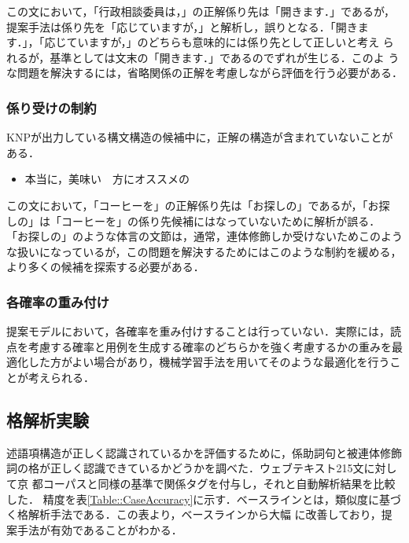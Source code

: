 \documentclass[japanese]{jnlp_1.3e}
\begin{document}
この文において，「行政相談委員は，」の正解係り先は「開きます．」であるが，
提案手法は係り先を「応じていますが，」と解析し，誤りとなる．「開きま
す．」，「応じていますが，」のどちらも意味的には係り先として正しいと考え
られるが，基準としては文末の「開きます．」であるのでずれが生じる．このよ
うな問題を解決するには，省略関係の正解を考慮しながら評価を行う必要がある．


\subsubsection*{係り受けの制約}

KNPが出力している構文構造の候補中に，正解の構造が含まれていないことがある．

\begin{itemize}
 \item 本当に，美味い~~方にオススメの
\end{itemize}

この文において，「コーヒーを」の正解係り先は「お探しの」であるが，「お探
しの」は「コーヒーを」の係り先候補にはなっていないために解析が誤る．
「お探しの」のような体言の文節は，通常，連体修飾しか受けないためこのよう
な扱いになっているが，この問題を解決するためにはこのような制約を緩める，
より多くの候補を探索する必要がある．


\subsubsection*{各確率の重み付け}

提案モデルにおいて，各確率を重み付けすることは行っていない．実際には，読
点を考慮する確率と用例を生成する確率のどちらかを強く考慮するかの重みを最
適化した方がよい場合があり，機械学習手法を用いてそのような最適化を行うこ
とが考えられる．


\subsection{格解析実験}

述語項構造が正しく認識されているかを評価するために，係助詞句と被連体修飾
詞の格が正しく認識できているかどうかを調べた．ウェブテキスト215文に対して京
都コーパスと同様の基準で関係タグを付与し，それと自動解析結果を比較した．
精度を表\ref{Table::CaseAccuracy}に示す．ベースラインとは，類似度に基づ
く格解析手法\cite{Kawahara2005}である．この表より，ベースラインから大幅
に改善しており，提案手法が有効であることがわかる．
\end{document}
